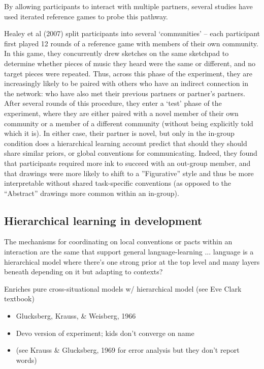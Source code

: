 \documentclass[11pt, floatsintext, jou]{apa6}
\begin{document}
By allowing participants to interact with multiple partners, several studies have used iterated reference games to probe this pathway. 

Healey et al (2007) split participants into several `communities' -- each participant first played 12 rounds of a reference game with members of their own community. In this game, they concurrently drew sketches on the same sketchpad to determine whether pieces of music they heard were the same or different, and no target pieces were repeated. Thus, across this phase of the experiment, they are increasingly likely to be paired with others who have an indirect connection in the network: who have also met their previous partners or partner's partners. After several rounds of this procedure, they enter a `test' phase of the experiment, where they are either paired with a novel member of their own community or a member of a different community (without being explicitly told which it is). In either case, their partner is novel, but only in the in-group condition does a hierarchical learning account predict that should they should share similar priors, or global conventions for communicating. Indeed, they found that participants required more ink to succeed with an out-group member, and that drawings were more likely to shift to a ''Figurative'' style and thus be more interpretable without shared task-specific conventions (as opposed to the ``Abstract'' drawings more common within an in-group). 

\subsection{Hierarchical learning in development}

The mechanisms for coordinating on local conventions or pacts within an interaction are the same that support general language-learning
... language is a hierarchical model where there's one strong prior at the top level and many layers beneath depending on it but adapting to contexts?

Enriches pure cross-situational models w/ hierarchical model (see Eve Clark textbook)

\begin{itemize}
\item Glucksberg, Krauss, \& Weisberg, 1966
\item Devo version of experiment; kids don't converge on name
\item (see Krauss \& Glucksberg, 1969 for error analysis but they don't report words)
\end{itemize}
\end{document}
